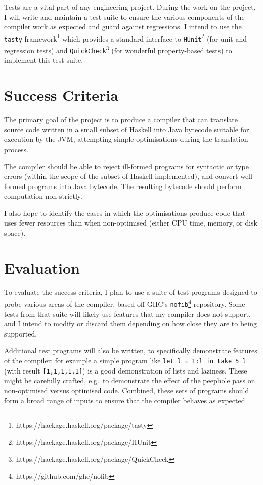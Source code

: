 \documentclass[12pt]{article}
\newcommand\haskell[1]{\texttt{#1}}
\newcommand\monospace[1]{\texttt{#1}}
\begin{document}
Tests are a vital part of any engineering project. During the work on the project, I will write and maintain a test
suite to ensure the various components of the compiler work as expected and guard against regressions. I intend to use
the \monospace{tasty} framework\footnote{https://hackage.haskell.org/package/tasty} which provides a standard interface
to \monospace{HUnit}\footnote{https://hackage.haskell.org/package/HUnit} (for unit and regression tests) and
\monospace{QuickCheck}\footnote{https://hackage.haskell.org/package/QuickCheck} (for wonderful property-based tests) to
implement this test suite.

\section*{Success Criteria}

The primary goal of the project is to produce a compiler that can translate source code written in a small subset of
Haskell into Java bytecode suitable for execution by the JVM, attempting simple optimisations during the translation
process.

The compiler should be able to reject ill-formed programs for syntactic or type errors (within the scope of the subset
of Haskell implemented), and convert well-formed programs into Java bytecode. The resulting bytecode should perform
computation non-strictly.

I also hope to identify the cases in which the optimisations produce code that uses fewer resources than when
non-optimised (either CPU time, memory, or disk space).

\section*{Evaluation}

To evaluate the success criteria, I plan to use a suite of test programs designed to probe various areas of the
compiler, based off GHC's \monospace{nofib}\footnote{https://github.com/ghc/nofib} repository. Some tests from that
suite will likely use features that my compiler does not support, and I intend to modify or discard them depending on
how close they are to being supported.

Additional test programs will also be written, to specifically demonstrate features of the compiler: for example a
simple program like \haskell{let l = 1:l in take 5 l} (with result \haskell{[1,1,1,1,1]}) is a good demonstration of
lists and laziness. These might be carefully crafted, e.g.\ to demonstrate the effect of the peephole pass on
non-optimised versus optimised code. Combined, these sets of programs should form a broad range of inputs to ensure that
the compiler behaves as expected.
\end{document}
